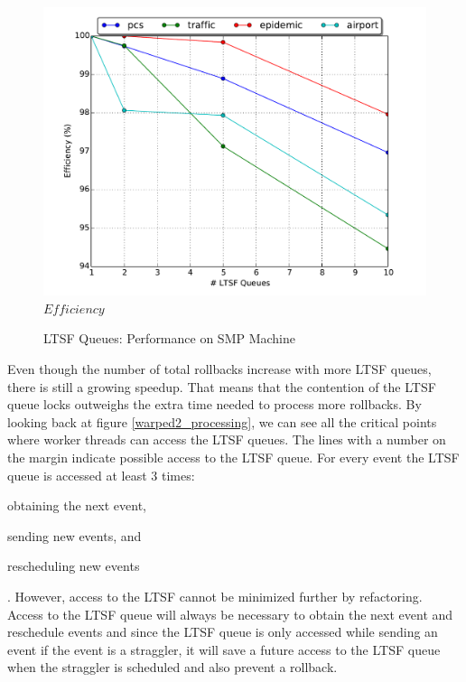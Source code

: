 \documentclass[11pt]{book}
\begin{document}
\begin{figure}
\begin{minipage}{.5\textwidth}
\begin{center}
      \includegraphics[width=\textwidth,keepaspectratio,quiet]{figs/pending_event_set/ltsf_efficiency.pdf} \\
      $Efficiency$ \\
    \end{center}
  \end{minipage}
  \caption{LTSF Queues: Performance on SMP Machine}\label{ltsf_analysis}
\end{figure}

Even though the number of total rollbacks increase with more LTSF queues, there is still a
growing speedup.  That means that the contention of the LTSF queue locks outweighs the extra time
needed to process more rollbacks.  By looking back at figure \ref{warped2_processing}, we can see all
the critical points where worker threads can access the LTSF queues.  The lines with a number on
the margin indicate possible access to the LTSF queue.  For every event the LTSF queue is accessed
at least 3 times: \begin{inparaenum}[(1)] \item obtaining the next event, \item sending new
events, and \item rescheduling new events \end{inparaenum}.  However, access to the LTSF cannot
be minimized further by refactoring.  Access to the LTSF queue will always be necessary to obtain
the next event and reschedule events and since the LTSF queue is only accessed while sending an
event if the event is a straggler, it will save a future access to the LTSF queue when the straggler
is scheduled and also prevent a rollback.
\end{document}
